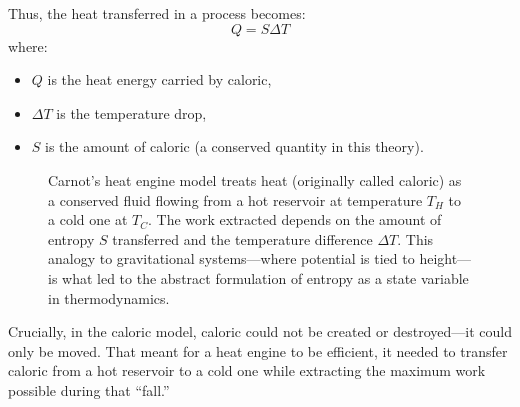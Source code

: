 Thus, the heat transferred in a process becomes:
\[
Q = S \Delta T
\]
where:
\begin{itemize}
  \item \( Q \) is the heat energy carried by caloric,
  \item \( \Delta T \) is the temperature drop,
  \item \( S \) is the amount of caloric (a conserved quantity in this theory).
\end{itemize}




\begin{figure}[H]
\centering
{}
\caption{
Carnot’s heat engine model treats heat (originally called caloric) as a conserved fluid flowing from a hot reservoir at temperature \( T_H \) to a cold one at \( T_C \). The work extracted depends on the amount of entropy \( S \) transferred and the temperature difference \( \Delta T \). This analogy to gravitational systems—where potential is tied to height—is what led to the abstract formulation of entropy as a state variable in thermodynamics.
}
\end{figure}



Crucially, in the caloric model, caloric could not be created or destroyed—it could only be moved. That meant for a heat engine to be efficient, it needed to transfer caloric from a hot reservoir to a cold one while extracting the maximum work possible during that “fall.”

